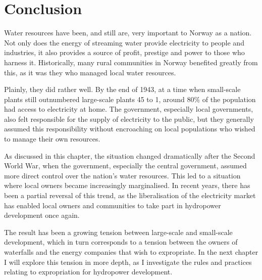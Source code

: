 \section{Conclusion}\label{sec:4:7}

Water resources have been, and still are, very important to Norway as a nation. Not only does the energy of streaming water provide electricity to people and industries, it also provides a source of profit, prestige and power to those who harness it. Historically, many rural communities in Norway benefited greatly from this, as it was they who managed local water resources.

Plainly, they did rather well. By the end of 1943, at a time when small-scale plants still outnumbered large-scale plants 45 to 1, around $80 \%$ of the population had access to electricity at home. The government, especially local governments, also felt responsible for the supply of electricity to the public, but they generally assumed this responsibility without encroaching on local populations who wished to manage their own resources.

As discussed in this chapter, the situation changed dramatically after the Second World War, when the government, especially the central government, assumed more direct control over the nation's water resources. This led to a situation where local owners became increasingly marginalised. In recent years, there has been a partial reversal of this trend, as the liberalisation of the electricity market has enabled local owners and communities to take part in hydropower development once again.

The result has been a growing tension between large-scale and small-scale development, which in turn corresponds to a tension between the owners of waterfalls and the energy companies that wish to expropriate. In the next chapter I will explore this tension in more depth, as I investigate the rules and practices relating to expropriation for hydropower development.